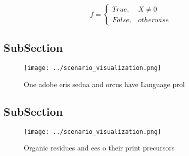 \documentclass[a4paper]{article}
\begin{document}
\begin{equation}   f =
\begin{cases} True, & X \neq 0\\
False, & otherwise
\end{cases}
\end{equation}

\subsection{SubSection}

\begin{figure}
\centering
\texttt{[image: ../scenario\_visualization.png]}
\caption{One adobe eris sedna and orcus have Language prol
}
\end{figure}
 
\subsection{SubSection}

\begin{figure}
\centering
\texttt{[image: ../scenario\_visualization.png]}
\caption{Organic residues and ees o their print precursors
}
\end{figure}
 
\end{document}
